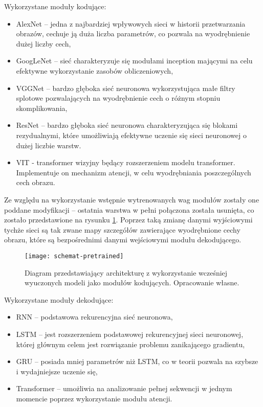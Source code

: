 Wykorzystane moduły kodujące:
\begin{itemize}
    \item AlexNet \cite{alexnet} -- jedna z najbardziej wpływowych sieci w historii przetwarzania obrazów, cechuje ją duża liczba parametrów, co pozwala na wyodrębnienie dużej liczby cech,
    \item GoogLeNet \cite{googlenet} -- sieć charakteryzuje się modułami inception mającymi na celu efektywne wykorzystanie zasobów obliczeniowych,
    \item VGGNet \cite{vggnet} -- bardzo głęboka sieć neuronowa wykorzystująca małe filtry splotowe pozwalających na wyodrębnienie cech o różnym stopniu skomplikowania,
    \item ResNet \cite{resnet} -- bardzo głęboka sieć neuronowa charakteryzująca się blokami rezydualnymi, które umożliwiają efektywne uczenie się sieci neuronowej o dużej liczbie warstw.
    \item VIT \cite{vit} - transformer wizyjny będący rozszerzeniem modelu transformer. Implementuje on mechanizm atencji, w celu wyodrębniania poszczególnych cech obrazu.
\end{itemize}
Ze względu na wykorzystanie wstępnie wytrenowanych wag modułów zostały one poddane modyfikacji -- ostatnia warstwa w pełni połączona została usunięta, co zostało przedstawione na rysunku \ref{fig:schemat-pretrained}. Poprzez taką zmianę danymi wyjściowymi tychże sieci są tak zwane mapy szczegółów zawierające wyodrębnione cechy obrazu, które są bezpośrednimi danymi wejściowymi modułu dekodującego.
\begin{figure}[H]
    \centering
    \texttt{[image: schemat-pretrained]}
    \caption{Diagram przedstawiający architekturę z wykorzystanie wcześniej wyuczonych modeli jako modułów kodujących. Opracowanie własne.}
    \label{fig:schemat-pretrained}
\end{figure}
\noindent Wykorzystane moduły dekodujące:
\begin{itemize}
    \item RNN \cite{rnn} -- podstawowa rekurencyjna sieć neuronowa,
    \item LSTM \cite{lstm} -- jest rozszerzeniem podstawowej rekurencyjnej sieci neuronowej, której głównym celem jest rozwiązanie problemu zanikającego gradientu,
    \item GRU \cite{gru} -- posiada mniej parametrów niż LSTM, co w teorii pozwala na szybsze i wydajniejsze uczenie się,
    \item Transformer \cite{transformer} -- umożliwia na analizowanie pełnej sekwencji w jednym momencie poprzez wykorzystanie modułu atencji.
\end{itemize}
